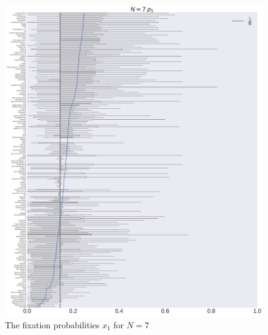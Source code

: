 \documentclass[10pt,letterpaper]{article}
\begin{document}
\begin{figure}[!hbtp]
    \centering
    \includegraphics[width=\textwidth]{./boxplot_7_invade.pdf}
    \caption{The fixation probabilities \(x_1\) for \(N=7\)}
\end{figure}
\end{document}

